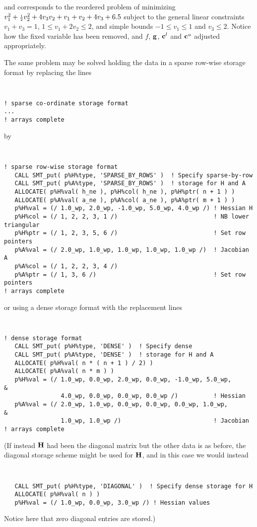 \documentclass{galahad}
\begin{document}
\noindent
and corresponds to the reordered problem of minimizing 
$v_1^2 + {\scriptstyle \frac{1}{2}} v_2^2 + 4 v_3 v_2 + v_1 + v_2 + 4 v_3 + 6.5$ 
subject to the general linear constraints 
$v_1 + v_3 = 1$, $1 \leq v_1 + 2 v_2 \leq 2$, 
and simple bounds 
$-1 \leq v_1 \leq 1$ and $v_3 \leq 2$. Notice how the 
fixed variable has been removed, and $f$, ${\mathbf{g}}$, ${\mathbf{c}}^l$ and ${\mathbf{c}}^u$ 
adjusted appropriately. 

The same problem may be solved holding the data in 
a sparse row-wise storage format by replacing the lines
{\tt \small
\begin{verbatim}
! sparse co-ordinate storage format
...
! arrays complete   
\end{verbatim}
}
\noindent
by
{\tt \small
\begin{verbatim}
! sparse row-wise storage format
   CALL SMT_put( p%H%type, 'SPARSE_BY_ROWS' )  ! Specify sparse-by-row
   CALL SMT_put( p%A%type, 'SPARSE_BY_ROWS' )  ! storage for H and A
   ALLOCATE( p%H%val( h_ne ), p%H%col( h_ne ), p%H%ptr( n + 1 ) )
   ALLOCATE( p%A%val( a_ne ), p%A%col( a_ne ), p%A%ptr( m + 1 ) )
   p%H%val = (/ 1.0_wp, 2.0_wp, -1.0_wp, 5.0_wp, 4.0_wp /) ! Hessian H
   p%H%col = (/ 1, 2, 2, 3, 1 /)                           ! NB lower triangular
   p%H%ptr = (/ 1, 2, 3, 5, 6 /)                           ! Set row pointers
   p%A%val = (/ 2.0_wp, 1.0_wp, 1.0_wp, 1.0_wp, 1.0_wp /)  ! Jacobian A
   p%A%col = (/ 1, 2, 2, 3, 4 /)
   p%A%ptr = (/ 1, 3, 6 /)                                 ! Set row pointers  
! arrays complete 
\end{verbatim}
}
\noindent
or using a dense storage format with the replacement lines
{\tt \small
\begin{verbatim}
! dense storage format
   CALL SMT_put( p%H%type, 'DENSE' )  ! Specify dense
   CALL SMT_put( p%A%type, 'DENSE' )  ! storage for H and A
   ALLOCATE( p%H%val( n * ( n + 1 ) / 2) )
   ALLOCATE( p%A%val( n * m ) )
   p%H%val = (/ 1.0_wp, 0.0_wp, 2.0_wp, 0.0_wp, -1.0_wp, 5.0_wp,              &
                4.0_wp, 0.0_wp, 0.0_wp, 0.0_wp /)          ! Hessian
   p%A%val = (/ 2.0_wp, 1.0_wp, 0.0_wp, 0.0_wp, 0.0_wp, 1.0_wp,               &
                1.0_wp, 1.0_wp /)                          ! Jacobian
! arrays complete 
\end{verbatim}
}
\noindent
(If instead ${\mathbf{H}}$ had been the diagonal matrix
but the other data is as before, the diagonal storage scheme 
might be used for ${\mathbf{H}}$, and in this case we would instead 
{\tt \small
\begin{verbatim}
   CALL SMT_put( p%H%type, 'DIAGONAL' )  ! Specify dense storage for H
   ALLOCATE( p%H%val( n ) )
   p%H%val = (/ 1.0_wp, 0.0_wp, 3.0_wp /) ! Hessian values
\end{verbatim}
}
\noindent
Notice here that zero diagonal entries are stored.)
\end{document}
